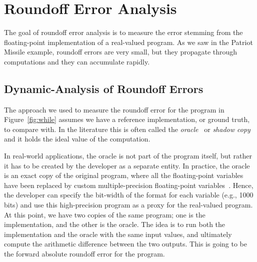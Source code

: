 \section{Roundoff Error Analysis}
%
The goal of roundoff error analysis is to measure the error stemming from the floating-point implementation of a real-valued program.
%
As we saw in the Patriot Missile example, roundoff errors are very small, but they propagate through computations and they can accumulate rapidly.
%
%
%
\subsection{Dynamic-Analysis of Roundoff Errors}
%
The approach we used to measure the roundoff error for the program in Figure~\ref{fig:while} assumes we have a reference implementation, or ground truth, to compare with.
%
In the literature this is often called the \emph{oracle}~\cite{blame} or \emph{shadow copy}~\cite{shadow} and it holds the ideal value of the computation.
%
% 

In real-world applications, the oracle is not part of the program itself, but rather it has to be created by the developer as a separate entity.
%
In practice, the oracle is an exact copy of the original program, where all the floating-point variables have been replaced by custom multiple-precision floating-point variables~\cite{mpfr}.
%
Hence, the developer can specify the bit-width of the format for each variable (e.g., 1000 bits) and use this high-precision program as a proxy for the real-valued program.
%
At this point, we have two copies of the same program; one is the implementation, and the other is the oracle. 
%
The idea is to run both the implementation and the oracle with the same input values, and ultimately compute the arithmetic difference between the two outputs. 
%
This is going to be the forward absolute roundoff error for the program. 
%

